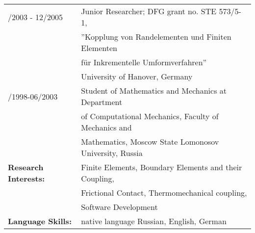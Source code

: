 \begin{tabular}[t]{ll}
\quad  10/2003 - 12/2005& Junior Researcher; DFG grant no. STE 573/5-1, \\
 & ''Kopplung von Randelementen und Finiten Elementen \\
 & f\"ur Inkrementelle Umformverfahren'' \\
 &              University of Hanover, Germany\\[1ex]
\quad 09/1998-06/2003 & Student of Mathematics and Mechanics at Department \\
                &  of Computational Mechanics, Faculty of Mechanics and \\
              & Mathematics, Moscow State Lomonosov University, Russia \\[1ex]
\textbf{Research Interests:}     &   Finite Elements, Boundary Elements and their Coupling, \\
&  Frictional Contact, Thermomechanical coupling, \\ &  Software Development \\[1ex]
\textbf{Language Skills:}     & native language Russian, English,  German
\end{tabular}
